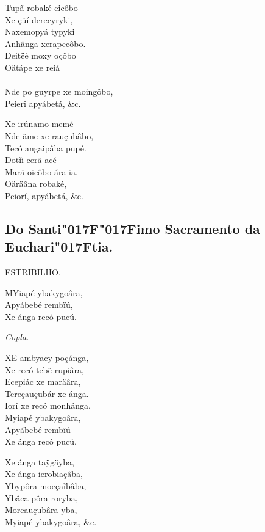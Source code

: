 \documentclass[openany,titlepage,12pt]{book}
\newcommand{\lgS}{\char"017F}
\newcommand{\lgSS}{\char"017F\char"017F}
\begin{document}
Tupã robaké eicôbo\\
Xe çüí derecyryki,\\
Naxemopyá typyki\\
Anhânga xerapecôbo.\\
Deitëé moxy oçôbo\\
Oätápe xe reiá\\%
\\
Nde po guyrpe xe moingôbo,\\
Peierî apyábetá, \&c.

Xe irúnamo memé\\
Nde ãme xe rauçubâbo,\\
Tecó angaipâba pupé.\\
Dotĩi cerã acé\\
Marã oicôbo ára ia.\\
Oäräâna robaké,\\
Peiorí, apyábetá, \&c.

\subsection{Do Santi\lgSS imo Sacramento da Euchari\lgS tia.}
\begin{center}
    ESTRIBILHO.
\end{center}

\lettrine[findent =4pt, nindent=0pt, lines=2]
{M}{Y}iapé ybakygoâra,\\
Apyábebé rembïú,\\
Xe ánga recó pucú.

\begin{center}
    \textit{Copla.}
\end{center}

\lettrine[findent =4pt, nindent=0pt, lines=2]
{X}{E} ambyacy poçánga,\\
Xe recó tebẽ rupiâra,\\
Ecepiác xe maräâra,\\
Tereçauçubár xe ánga.\\
Iorí xe recó monhánga,\\
Myiapé ybakygoâra,\\
Apyábebé rembïú\\%
Xe ánga recó pucú.

Xe ánga taÿgäyba,\\
Xe ánga ierobiaçâba,\\
Ybypôra moeçaĩbâba,\\
Ybâca pôra roryba,\\
Moreauçubâra yba,\\
Myiapé ybakygoâra, \&c.
\end{document}

